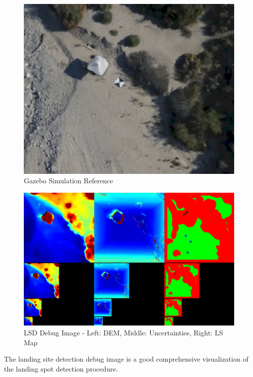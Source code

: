 \begin{figure}[ht!]
    \centering
    \includegraphics[scale=0.25]{images/setup/lsd_debug_reference.png}
    \caption{Gazebo Simulation Reference}
    \label{fig:lsd_debug_ref}
\end{figure}

\begin{figure}[ht!]
    \centering
    \includegraphics[scale=0.25]{images/setup/lsd_debug_image.png}
    \caption{LSD Debug Image - Left: DEM, Middle: Uncertainties, Right: LS Map}
    \label{fig:lsd_debug}
\end{figure}

The landing site detection debug image is a good comprehensive visualization of the landing spot detection procedure. 

